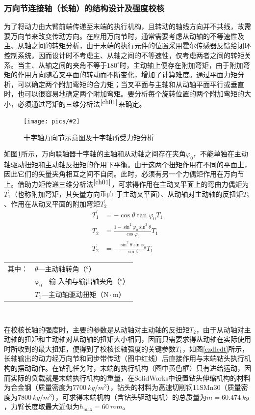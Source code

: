 \documentclass[UTF8]{article}%
\newcommand{\p}[4][0.5]{\begin{figure}[h]\centering\texttt{[image: pics/\#2]}\\\caption{#3}\label{#4}\end{figure}}%
\newcommand{\urf}[1]{$^{\cite{#1}}$}%
\newcommand{\n}{\par}%
\begin{document}
\begin{spacing}{1.5}
		\subsubsection{万向节连接轴（长轴）的结构设计及强度校核}
		为了将动力由大臂前端传递至末端的执行机构，且转动的轴线方向并不共线，故需要万向节来改变传动方向。在应用万向节时，通常需要考虑从动轴的不等速性及主、从轴之间的转矩分析，由于末端的执行元件的位置采用霍尔传感器反馈给闭环控制系统，因而设计时不考虑主、从轴之间的不等速性，仅考虑两者之间的转矩关系。当主、从轴之间的夹角不等于$180^{\circ}$时，主动轴上便存在附加弯矩，由于附加弯矩的作用方向随着叉平面的转动而不断变化，增加了计算难度。通过平面力矩分析，可以确定两个附加弯矩的合力矩；当叉平面与主轴和从动轴平面平行或垂直时，也可以很容易地确定两个附加弯矩。要分析每个旋转位置的两个附加弯矩的大小，必须通过弯矩的三维分析法\urf{ch01}来确定。
		\p[0.15]{十字轴万向节示意图及受力分析图.PDF}{十字轴万向节示意图及十字轴所受力矩分析}{szzsxfx}
		如图\ref{szzsxfx}所示，万向联轴器十字轴的主轴和从动轴之间存在夹角$\varphi_0$，不能单独在主动轴驱动扭矩和主动轴反扭矩的作用下平衡。由于这两个扭矩作用在不同的平面上，因此它们的矢量夹角相互之间不自闭。此时，必须有另一个力偶矩作用在万向节上。借助力矩传递三维分析法\urf{ch01}，可求得作用在主动叉平面上的弯曲力偶矩为$T_{1}^{\prime}$（也称附加弯矩，其矢量方向垂直 于主动叉平面）、从动轴对主动轴的反扭矩$T_2$、作用在从动叉平面的附加弯矩$T_{2}^{\prime}$
		\begin{align*}
			T_{1}^{\prime}&=-\cos\theta\tan\varphi_{0}T_{1}\tag{2-1}\\
			T_{2}&=\frac{1-\sin^{2}\varphi_{0}\sin^{2}\theta}{\cos\varphi_{0}}T_{1}\tag{2-2}\\
			T_{2}^{\prime}&=-\frac{\sin^{2}\theta\sin\varphi_{0}}{\sin\beta}T_{1}\tag{2-3}
		\end{align*}
		\begin{tabular}{cl}
		其中：&$\theta$—主动轴转角（°）\\
			&$\varphi_0$—输 入轴与输出轴夹角（°）\\
			&$T_1$—主动轴驱动扭矩（$\mathrm{N\cdot m}$）\\
		\end{tabular}\\\n
		在校核长轴的强度时，主要的参数是从动轴对主动轴的反扭矩$T_2$，由于从动轴对主动轴的扭矩和主动轴对从动轴的扭矩大小相同，因而只需要求得从动轴在实际使用时所收到的最大扭矩，便得到了校核长轴强度的关键参数$T_1$，如图\ref{czdlcdt}所示，长轴输出的动力经万向节和同步带传动（图中红线）后直接作用与末端钻头执行机构的摆动动作。在钻孔任务时，末端的执行机构（图中黄色框）只有进给运动，因而实际的负载就是末端执行机构的重量，在SolidWorks中设置钻头伸缩机构的材料为合金钢（质量密度为$\SI{7700}{kg/m^3}$），钻头的材料为高速切削钢11SMn30（质量密度为$\SI{7800}{kg/m^3}$），可求得末端机构（含钻头驱动电机）的总质量为$m=\SI{60.474}{kg}$，力臂长度取最大近似为$h_{\max}=\SI{60}{mm}$。\n

\end{spacing}
\end{document}
